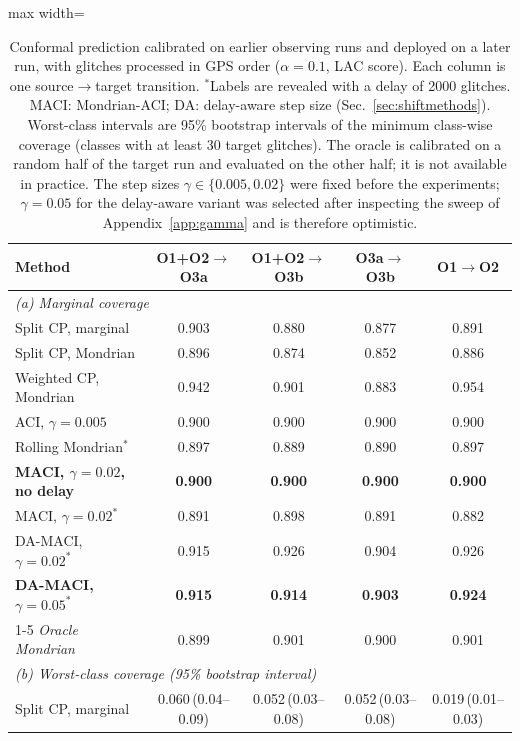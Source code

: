 \begin{table}[!t]
\caption{Conformal prediction calibrated on earlier observing runs and deployed on a later run, with glitches processed in GPS
order ($\alpha=0.1$, LAC score). Each column is one source$\rightarrow$target transition. $^{\ast}$Labels are revealed with a delay of
2000 glitches. MACI: Mondrian-ACI; DA: delay-aware step size (Sec.~\ref{sec:shiftmethods}). Worst-class intervals are 95\% bootstrap intervals of the
minimum class-wise coverage (classes with at least 30 target glitches). The oracle is calibrated on a random half of the target run and
evaluated on the other half; it is not available in practice. The step sizes $\gamma\in\{0.005,0.02\}$ were fixed before the
experiments; $\gamma=0.05$ for the delay-aware variant was selected after inspecting the sweep of Appendix~\ref{app:gamma} and is
therefore optimistic.}\label{tab:e2}
\centering\small\setlength{\tabcolsep}{9pt}
\begin{adjustbox}{max width=\textwidth}\begin{tabular}{lcccc}\toprule
Method & O1+O2$\rightarrow$O3a & O1+O2$\rightarrow$O3b & O3a$\rightarrow$O3b & O1$\rightarrow$O2\\\midrule
\multicolumn{5}{l}{\emph{(a) Marginal coverage}}\\
Split CP, marginal & 0.903 & 0.880 & 0.877 & 0.891\\
Split CP, Mondrian & 0.896 & 0.874 & 0.852 & 0.886\\
Weighted CP, Mondrian & 0.942 & 0.901 & 0.883 & 0.954\\
ACI, $\gamma=0.005$ & 0.900 & 0.900 & 0.900 & 0.900\\
Rolling Mondrian$^{\ast}$ & 0.897 & 0.889 & 0.890 & 0.897\\
\textbf{MACI, $\gamma=0.02$, no delay} & \textbf{0.900} & \textbf{0.900} & \textbf{0.900} & \textbf{0.900}\\
MACI, $\gamma=0.02^{\ast}$ & 0.891 & 0.898 & 0.891 & 0.882\\
DA-MACI, $\gamma=0.02^{\ast}$ & 0.915 & 0.926 & 0.904 & 0.926\\
\textbf{DA-MACI, $\gamma=0.05^{\ast}$} & \textbf{0.915} & \textbf{0.914} & \textbf{0.903} & \textbf{0.924}\\
\cmidrule(l){1-5}
\emph{Oracle Mondrian} & 0.899 & 0.901 & 0.900 & 0.901\\
\midrule
\multicolumn{5}{l}{\emph{(b) Worst-class coverage (95\% bootstrap interval)}}\\
Split CP, marginal & 0.060\,{\tiny(0.04--0.09)} & 0.052\,{\tiny(0.03--0.08)} & 0.052\,{\tiny(0.03--0.08)} & 0.019\,{\tiny(0.01--0.03)}\\

\end{tabular}
\end{adjustbox}
\end{table}
